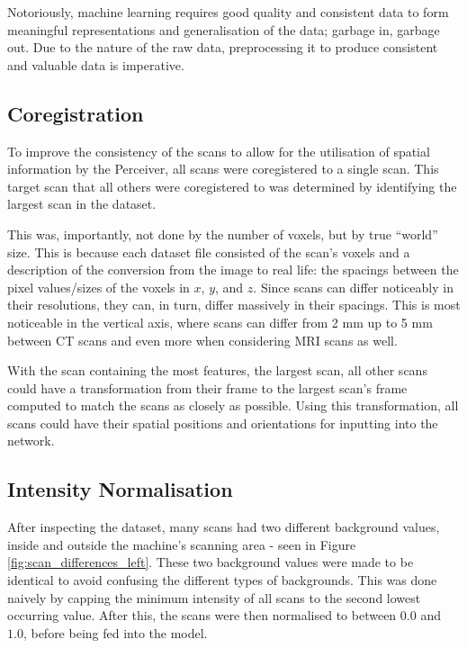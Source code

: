 \documentclass{l4proj}
\begin{document}
Notoriously, machine learning requires good quality and consistent data to form meaningful representations and generalisation of the data; garbage in, garbage out. Due to the nature of the raw data, preprocessing it to produce consistent and valuable data is imperative.

\subsection{Coregistration} \label{sec:coregistration}

To improve the consistency of the scans to allow for the utilisation of spatial information by the Perceiver, all scans were coregistered to a single scan. This target scan that all others were coregistered to was determined by identifying the largest scan in the dataset.

This was, importantly, not done by the number of voxels, but by true “world” size. This is because each dataset file consisted of the scan’s voxels and a description of the conversion from the image to real life: the spacings between the pixel values/sizes of the voxels in $x$, $y$, and $z$. Since scans can differ noticeably in their resolutions, they can, in turn, differ massively in their spacings. This is most noticeable in the vertical axis, where scans can differ from 2 mm up to 5 mm between CT scans and even more when considering MRI scans as well.

With the scan containing the most features, the largest scan, all other scans could have a transformation from their frame to the largest scan’s frame computed to match the scans as closely as possible. Using this transformation, all scans could have their spatial positions and orientations for inputting into the network.

\subsection{Intensity Normalisation}

After inspecting the dataset, many scans had two different background values, inside and outside the machine’s scanning area - seen in Figure \ref{fig:scan_differences_left}. These two background values were made to be identical to avoid confusing the different types of backgrounds. This was done naively by capping the minimum intensity of all scans to the second lowest occurring value. After this, the scans were then normalised to between $0.0$ and $1.0$, before being fed into the model.
\end{document}
